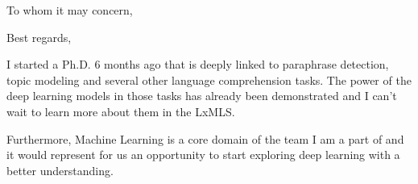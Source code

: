 \documentclass[11pt,a4paper,sans]{moderncv}        %
\begin{document}
\clearpage
\date{April 8, 2015}
\opening{To whom it may concern,}
\closing{Best regards,}
\makelettertitle

I started a Ph.D. 6 months ago that is deeply linked to paraphrase
detection, topic modeling and several other language comprehension
tasks. The power of the deep learning models in those tasks has
already been demonstrated and I can't wait to learn more about them in
the LxMLS.

Furthermore, Machine Learning is a core domain of the team
I am a part of and it would represent for us an opportunity to start
exploring deep learning with a better understanding.

\makeletterclosing

\end{document}
